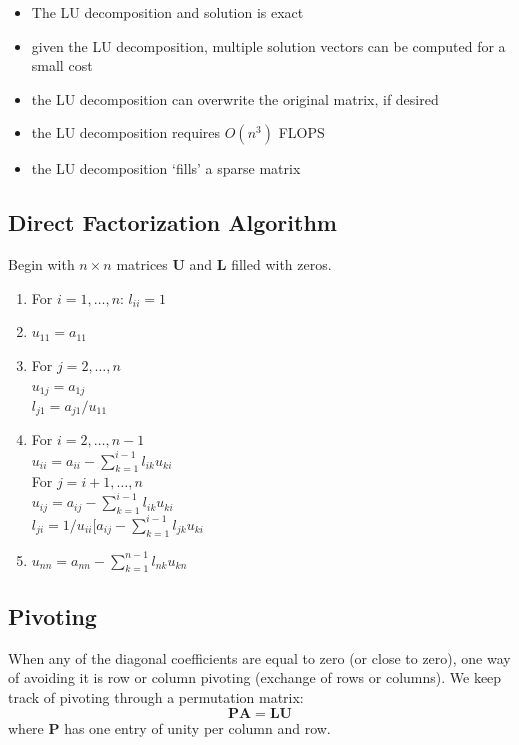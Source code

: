 \documentclass[12pt]{article}
\newcommand{\ve}[1]{\ensuremath{\mathbf{#1}}}
\begin{document}
\begin{itemize}
\item The LU decomposition and solution is exact
\item given the LU decomposition, multiple solution vectors can be computed for a small cost
\item the LU decomposition can overwrite the original matrix, if desired
\item the LU decomposition requires $O(n^3)$ FLOPS
\item the LU decomposition `fills' a sparse matrix
\end{itemize}	

\subsection{Direct Factorization Algorithm}
Begin with $n \times n$ matrices $\ve{U}$ and $\ve{L}$ filled with zeros.
%
\begin{enumerate}
\item For $i = 1, \dots, n$: $l_{ii} = 1$
\item $u_{11} = a_{11}$

\item For $j = 2, \dots, n$\\
  \hspace*{1 em} $u_{1j} = a_{1j}$\\
  \hspace*{1 em} $l_{j1} = a_{j1}/u_{11}$
 
\item For $i = 2, \dots, n-1$\\
  \hspace*{1 em} $u_{ii} = a_{ii} - \sum_{k=1}^{i-1} l_{ik} u_{ki}$\\
  \hspace*{1 em} For $j = i+1, \dots, n$\\   
    \hspace*{3 em} $u_{ij} = a_{ij} - \sum_{k=1}^{i-1} l_{ik} u_{ki}$\\
    \hspace*{3 em} $l_{ji} = 1/u_{ii}[a_{ij} - \sum_{k=1}^{i-1} l_{jk} u_{ki}$
    
\item $u_{nn} = a_{nn} - \sum_{k=1}^{n-1} l_{nk} u_{kn}$
\end{enumerate}

\subsection{Pivoting}
When any of the diagonal coefficients are equal to zero (or close to zero), one way of avoiding it is row or column pivoting (exchange of rows or columns). We keep track of pivoting through a permutation matrix:
\[\ve{P}\ve{A} = \ve{L}\ve{U}\]
where $\ve{P}$ has one entry of unity per column and row.
\end{document}
